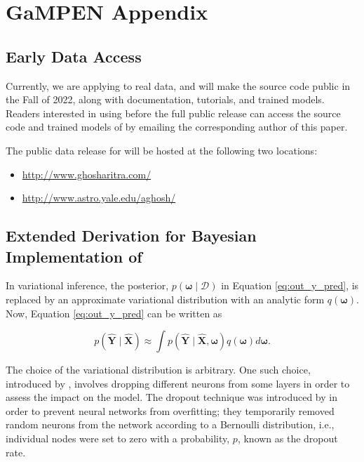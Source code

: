 
\chapter*{GaMPEN Appendix}\label{ch:gampen_appendix}

\section{Early Data Access}\label{sec_c2:ap:data_access}
Currently, we are applying \gampen{} to real data, and will make the source code public in the Fall of 2022, along with documentation, tutorials, and trained models. Readers interested in using \gampen{} before the full public release can access the source code and trained models of \gampen{} by emailing the corresponding author of this paper. 

The public data release for \gampen{} will be hosted at the following two locations:

\begin{itemize}
    \item \href{http://www.ghosharitra.com/}{http://www.ghosharitra.com/}
    \item \href{http://www.astro.yale.edu/aghosh/}{http://www.astro.yale.edu/aghosh/}
\end{itemize}


\section{Extended Derivation for Bayesian Implementation of \gampen{}} \label{sec_c2:ap:mcd_deri}

In variational inference, the posterior, $p(\boldsymbol{\omega} \mid \mathcal{D})$ in Equation \ref{eq:out_y_pred}, is replaced by an approximate variational distribution with an analytic form $q(\boldsymbol{\omega})$. Now, Equation \ref{eq:out_y_pred} can be written as

\begin{equation}
p(\boldsymbol{\hat{Y}} \mid \boldsymbol{\hat{X}}) \approx \int p(\boldsymbol{\hat{Y}} \mid \boldsymbol{\hat{X}}, \boldsymbol{\omega}) q(\boldsymbol{\omega}) d \boldsymbol{\omega} .
\label{eq:out_y_pred_vi}
\end{equation}

The choice of the variational distribution is arbitrary. 
One such choice, introduced by \cite{gal_2016}, involves dropping different neurons from some layers in order to assess the impact on the model. 
The dropout technique was introduced by \cite{Srivastava2014Dropout:Overfitting} in order to prevent neural networks from overfitting; they temporarily removed random neurons from the network according to a Bernoulli distribution, i.e., individual nodes were set to zero with a probability, $p$, known as the dropout rate. 

